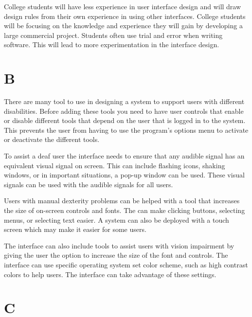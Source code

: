 \documentclass[12pt]{article}
\begin{document}
College students will have less experience in user interface design and 
will draw design rules from their own experience in using other interfaces.
College students will be focusing on the knowledge and experience they
will gain by developing a large commercial project.  Students often use 
trial and error when writing software.  This will lead to more
experimentation in the interface design.   

\section*{B}

There are many tool to use in designing a system to support users with 
different disabilities.  Before adding these tools you need to have user
controls that enable or disable different tools that depend on the user
that is logged in to the system.  This prevents the user from having to
use the program's options menu to activate or deactivate the different
tools.

To assist a deaf user the interface needs to ensure that any audible signal
has an equivalent visual signal on screen.  This can include flashing 
icons, shaking windows, or in important situations, a pop-up window can
be used.  These visual signals can be used with the audible signals for
all users.

Users with manual dexterity problems can be helped with a tool that
increases the size of on-screen controls and fonts.  The can make clicking
buttons, selecting menus, or selecting text easier.  A system can also
be deployed with a touch screen which may make it easier for some users.

The interface can also include tools to assist users with vision 
impairment by giving the user the option to increase the size of the font
and controls.  The interface can use specific operating system set color
scheme, such as high contrast colors to help users.  The interface can 
take advantage of these settings.

\section*{C}
\end{document}

